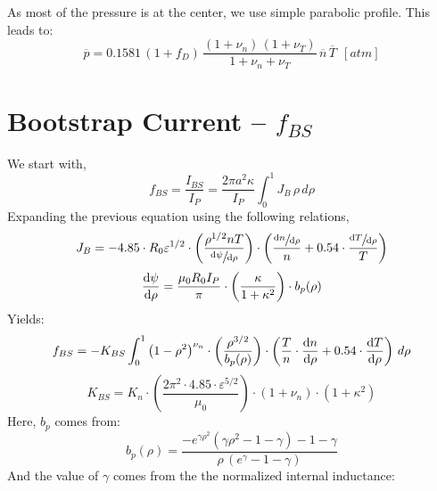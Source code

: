 As most of the pressure is at the center, we use simple parabolic profile. This leads to:
\begin{equation}
	\overline{p} = 0.1581 \, ( 1 + f_D ) \, \frac{ (1 + \nu_n) \, (1 + \nu_T) }{1 + \nu_n + \nu_T } \, \overline{n} \, \overline{T} \ \ [atm]
\end{equation}

\section{Bootstrap Current -- $f_{BS}$}

\label{section:pedestalbootstrap}

We start with,
\begin{equation}
	f_{BS} = \frac{I_{BS}}{I_P} = \frac{ 2 \pi a^2 \kappa }{I_P} \int_0^1 J_B \, \rho \, d\rho
\end{equation}
Expanding the previous equation using the following relations,
\begin{equation}
	J_B = -4.85 \cdot R_0 \varepsilon^{1/2} \cdot \left( \frac{ \rho^{1/2} n T }{ \sfrac{ \textnormal{d}\psi }{ \textnormal{d}\rho } } \right) \cdot \left( \frac{ \sfrac{ \textnormal{d}n }{ \textnormal{d}\rho } }{ n } + 0.54 \cdot \frac{ \sfrac{ \textnormal{d}T }{ \textnormal{d}\rho } }{ T } \right)
\end{equation}
\begin{equation}
	\frac{ \textnormal{d}\psi }{ \textnormal{d}\rho } = \frac{ \mu_0 R_0 I_P }{ \pi } \cdot \left( \frac{ \kappa}{1+\kappa^2} \right) \cdot b_p(\rho)
\end{equation}
Yields:
\begin{equation}
	f_{BS} = -K_{BS} \int_0^1 \left( 1 - \rho^2  \right)^{\nu_n} \cdot \left( \frac{ \rho^{3/2} }{ b_p(\rho) } \right) \cdot \left( \frac{T}{ n } \cdot  \frac{ \textnormal{d}n }{ \textnormal{d}\rho } + 0.54 \cdot  \frac{ \textnormal{d}T }{ \textnormal{d}\rho }  \right)
 \, d\rho
\end{equation}
\begin{equation}
	K_{BS} = K_n \cdot \left( \frac{ 2 \pi^2 \cdot 4.85 \cdot \varepsilon^{5/2} }{\mu_0} \right) \cdot ( 1 + \nu_n ) \cdot ( 1 + \kappa^2 )
\end{equation}
Here, $b_p$ comes from:
\begin{equation}
	b_p(\rho) = \frac{ -e^{\gamma\rho^2} ( \gamma\rho^2 - 1 - \gamma ) - 1 - \gamma }{\rho \,( e^\gamma - 1 - \gamma ) }
\end{equation}
And the value of $\gamma$ comes from the the normalized internal inductance:
